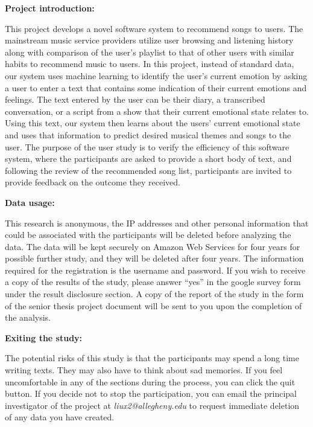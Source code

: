 \begin{displayquote}
  \textbf{Project introduction:}

  This project develops a novel software system to recommend songs to users. The
  mainstream music service providers utilize user browsing and listening history
  along with comparison of the user’s playlist to that of other users with similar
  habits to recommend music to users. In this project, instead of standard data,
  our system uses machine learning to identify the user's current emotion by asking
  a user to enter a text that contains some indication of their current emotions
  and feelings. The text entered by the user can be their diary, a transcribed
  conversation, or a script from a show that their current emotional state relates
  to. Using this text, our system then learns about the users’ current emotional
  state and uses that information to predict desired musical themes and songs to
  the user. The purpose of the user study is to verify the efficiency of this
  software system, where the participants are asked to provide a short body of
  text, and following the review of the recommended song list, participants are
  invited to provide feedback on the outcome they received.

  \textbf{Data usage:}

  This research is anonymous, the IP addresses and other personal information
  that could be associated with the participants will be deleted before analyzing
  the data. The data will be kept securely on Amazon Web Services for four years
  for possible further study, and they will be deleted after four years. The
  information required for the registration is the username and password. If you
  wish to receive a copy of the results of the study, please answer “yes” in the
  google survey form under the result disclosure section. A copy of the report of
  the study in the form of the senior thesis project document will be sent to you
  upon the completion of the analysis.

  \textbf{Exiting the study:}

  The potential risks of this study is that the participants may spend a long
  time writing texts. They  may also have to think about sad memories. If you
  feel uncomfortable in any of the sections during the process, you can click the
  quit button. If you decide not to stop the participation, you can email the
  principal investigator of the project at \emph{liux2@allegheny.edu} to request
  immediate deletion of any data you have created.


\end{displayquote}
